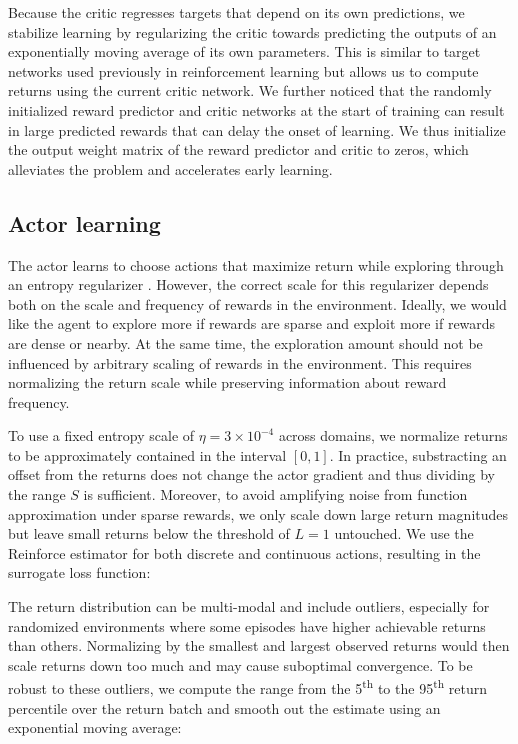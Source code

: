 Because the critic regresses targets that depend on its own predictions, we stabilize learning by regularizing the critic towards predicting the outputs of an exponentially moving average of its own parameters.
This is similar to target networks used previously in reinforcement learning \citep{mnih2015dqn} but allows us to compute returns using the current critic network.
We further noticed that the randomly initialized reward predictor and critic networks at the start of training can result in large predicted rewards that can delay the onset of learning.
We thus initialize the output weight matrix of the reward predictor and critic to zeros, which alleviates the problem and accelerates early learning.

\subsection*{Actor learning}

The actor learns to choose actions that maximize return while exploring through an entropy regularizer \citep{williams1991maxentreinforce}.
However, the correct scale for this regularizer depends both on the scale and frequency of rewards in the environment.
Ideally, we would like the agent to explore more if rewards are sparse and exploit more if rewards are dense or nearby. At the same time, the exploration amount should not be influenced by arbitrary scaling of rewards in the environment.
This requires normalizing the return scale while preserving information about reward frequency.

To use a fixed entropy scale of $\eta=3\times10^{-4}$ across domains, we normalize returns to be approximately contained in the interval $[0, 1]$. In practice, substracting an offset from the returns does not change the actor gradient and thus dividing by the range $S$ is sufficient. Moreover, to avoid amplifying noise from function approximation under sparse rewards, we only scale down large return magnitudes but leave small returns below the threshold of $L=1$ untouched. We use the Reinforce estimator \citep{williams1992reinforce} for both discrete and continuous actions, resulting in the surrogate loss function:


The return distribution can be multi-modal and include outliers, especially for randomized environments where some episodes have higher achievable returns than others. Normalizing by the smallest and largest observed returns would then scale returns down too much and may cause suboptimal convergence. To be robust to these outliers, we compute the range from the 5\textsuperscript{th} to the 95\textsuperscript{th} return percentile over the return batch and smooth out the estimate using an exponential moving average:

